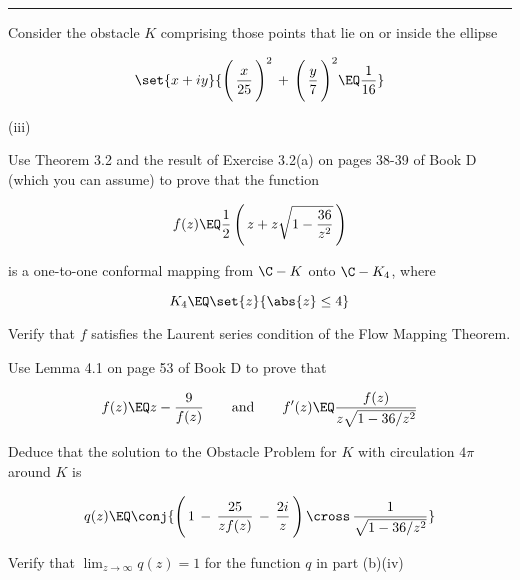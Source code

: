 \documentclass[english,a4paper,11pt]{scrartcl}
\begin{document}
\comment{===========================================================}
\noindent\rule[0.5ex]{\linewidth}{1pt} 
\newpage
\begin{Question}{}

 Consider the obstacle $K$ comprising those points that lie on or inside
the ellipse

\[ \set{x + iy}{ \Bigg(\, \frac{x}{25} \,\Bigg)^2 \,+\, \Bigg(\, \frac{y}{7} \,\Bigg)^2 \EQ \frac1{16} } \]

\bigskip
\begin{labeling}{(iii) }
  \item [(i)] Use Theorem 3.2 and the result of Exercise 3.2(a) on pages 38-39 of Book D (which you can assume) to prove that the function
  
\[ f(z) \EQ \frac1{2} \left(\, z + z \sqrt{1 - \frac{36}{z^2}} \,\right) \]

is a one-to-one conformal mapping from $\C - K$ onto $\C - K_4$, where

\[ K_4 \EQ \set{z}{\abs{z} \leq 4} \]

\bigskip  
  \item [(ii)]  Verify that $f$ satisfies the Laurent series condition of the Flow Mapping Theorem.\\
  
  \item [(iii)]  Use Lemma 4.1 on page 53 of Book D to prove that 
  
\[ f(z)  \EQ z - \frac{9}{f(z)} \qquad \text{and} \qquad 
   f'(z) \EQ \frac{f(z)}{z \sqrt{1 - 36/z^2}} \]

\bigskip
  \item [(iv)] Deduce that the solution to the Obstacle Problem for $K$ with circulation $4\pi$ around $K$ is

\[ q(z) \EQ \conj{\Bigg(\,  1 \,-\, \frac{25}{z f(z)} \,-\, \frac{2i}{z} \,\Bigg) \, \cross \, \frac1{\sqrt{1 - 36/z^2}} }  \]
  
\bigskip
  \item [(v)] Verify that $\displaystyle \lim_{z\to\infty} q(z) = 1$ for the function $q$ in part (b)(iv) \\
      
\end{labeling}

\bigskip
\end{Question}

\setcounter{equation}{0}
\end{document}
